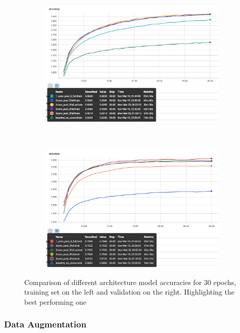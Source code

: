 \documentclass[12pt]{article}
\begin{document}
\begin{figure}[ht!]
    \centering
    \begin{subfigure}[t]{0.475\textwidth}
        \centering
        \includegraphics[width=1.0\linewidth]{netowrkacct.png}
    \end{subfigure}%
    ~ 
    \begin{subfigure}[t]{0.475\textwidth}
        \centering
        \includegraphics[width=1.0\linewidth]{networkacc.png}
    \end{subfigure}
    \caption{Comparison of different architecture model accuracies for 30 epochs, training set on the left and validation on the right. Highlighting the best performing one}
    \label{fig:arch}
\end{figure}

\subsubsection*{Data Augmentation}
\end{document}
